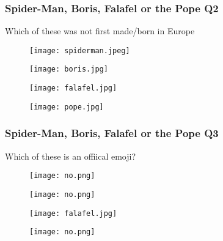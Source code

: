 \documentclass{beamer}
\begin{document}
\begin{frame}
\frametitle{Spider-Man, Boris, Falafel or the Pope Q2}
Which of these was not first made/born in Europe
\begin{figure}[!htb]
    \centering
    \begin{minipage}{.5\textwidth}
        \centering
        \texttt{[image: spiderman.jpeg]}
        
    \end{minipage}%
    \begin{minipage}{0.5\textwidth}
        \centering
        \texttt{[image: boris.jpg]}
        
    \end{minipage}
\end{figure}
\begin{figure}[!htb]
    \centering
    \begin{minipage}{.5\textwidth}
        \centering
        \texttt{[image: falafel.jpg]}
        
    \end{minipage}%
    \begin{minipage}{0.5\textwidth}
        \centering
        \texttt{[image: pope.jpg]}
        
    \end{minipage}
\end{figure}
\end{frame}

\begin{frame}
\frametitle{Spider-Man, Boris, Falafel or the Pope Q3}
Which of these is an offiical emoji?
\begin{figure}[!htb]
    \centering
    \begin{minipage}{.5\textwidth}
        \centering
        \texttt{[image: no.png]}
        
    \end{minipage}%
    \begin{minipage}{0.5\textwidth}
        \centering
        \texttt{[image: no.png]}
        
    \end{minipage}
\end{figure}
\begin{figure}[!htb]
    \centering
    \begin{minipage}{.5\textwidth}
        \centering
        \texttt{[image: falafel.jpg]}
        
    \end{minipage}%
    \begin{minipage}{0.5\textwidth}
        \centering
        \texttt{[image: no.png]}
        
    \end{minipage}
\end{figure}
\end{frame}
\end{document}
